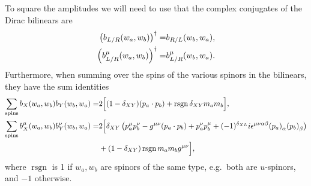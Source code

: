 \documentclass[../main.tex]{subfiles}
\begin{document}
To square the amplitudes we will need to use that the complex conjugates of the Dirac bilinears are
\begin{subequations}
  \label{pc:eq:bilinear_conjugate}
  \begin{align}
    \left(b_{L/R}(w_a, w_b)\right)^\dagger =     & b_{R/L}(w_b, w_a),
    \\
    \left(b_{L/R}^\mu(w_a, w_b)\right)^\dagger = & b_{L/R}^\mu(w_b,
    w_a).
  \end{align}
\end{subequations}
Furthermore, when summing over the spins of the various spinors in the
bilinears, they have the sum identities
\begin{align}
  \label{pc:eq:scalar_bilinear_trace}
  \sum_{\text{spins}} b_X(w_a, w_b) b_Y(w_b, w_a) =         & 2 \Big[
    (1-\delta_{XY}) (p_a \cdot p_b) + \operatorname{rsgn}
    \delta_{XY} m_a m_b
    \Big],
  \\
  \nonumber
  \label{pc:eq:vector_bilinear_trace}
  \sum_{\text{spins}} b_X^\mu(w_a, w_b) b_Y^\nu(w_b, w_a) = & 2\Big[
    \delta_{XY}\pclosed{p_a^\mu p_b^\nu - \g (p_a \cdot p_b) +
      p_a^\nu
      p_b^\mu +
      (-1)^{\delta_{XL}} i \epsilon^{\mu\nu\alpha\beta}
      \tensor{(p_a)}{_\alpha}
  \tensor{(p_b)}{_\beta}}                                             \\
                                                            & +
    (1-\delta_{XY})\operatorname{rsgn} m_a m_b \g \Big],
\end{align}
where \(\operatorname{rsgn}\) is 1 if \(w_a, w_b\) are spinors of the same
type, e.g.\ both are \(u\)-spinors, and \(-1\) otherwise.
\end{document}
